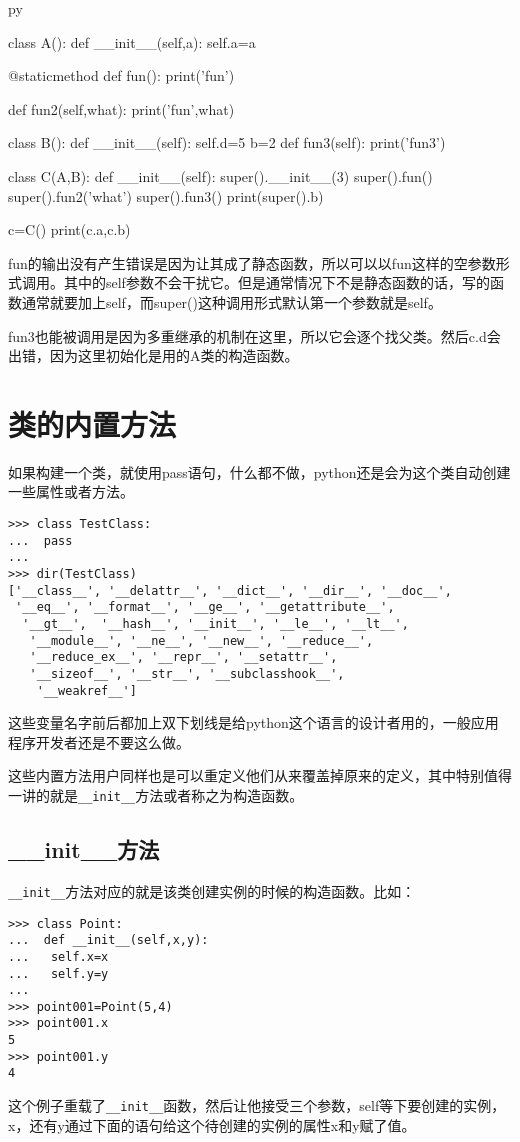 \documentclass[12pt,oneside]{book}
\begin{document}
\begin{common-format}
\begin{xverbatim}[129]{py}

class A():
    def __init__(self,a):
        self.a=a

    @staticmethod
    def fun():
        print('fun')

    def fun2(self,what):
        print('fun',what)

class B():
    def __init__(self):
        self.d=5
    b=2
    def fun3(self):
        print('fun3')

class C(A,B):
    def __init__(self):
        super().__init__(3)
        super().fun()
        super().fun2('what')
        super().fun3()
        print(super().b)

c=C()
print(c.a,c.b)
\end{xverbatim}
fun的输出没有产生错误是因为让其成了静态函数，所以可以以fun这样的空参数形式调用。其中的self参数不会干扰它。但是通常情况下不是静态函数的话，写的函数通常就要加上self，而super()这种调用形式默认第一个参数就是self。

fun3也能被调用是因为多重继承的机制在这里，所以它会逐个找父类。然后c.d会出错，因为这里初始化是用的A类的构造函数。


\section{类的内置方法}
如果构建一个类，就使用pass语句，什么都不做，python还是会为这个类自动创建一些属性或者方法。
\begin{Verbatim}
>>> class TestClass:
...  pass
... 
>>> dir(TestClass)
['__class__', '__delattr__', '__dict__', '__dir__', '__doc__',
 '__eq__', '__format__', '__ge__', '__getattribute__',
  '__gt__',  '__hash__', '__init__', '__le__', '__lt__',
   '__module__', '__ne__', '__new__', '__reduce__', 
   '__reduce_ex__', '__repr__', '__setattr__', 
   '__sizeof__', '__str__', '__subclasshook__',
    '__weakref__']
\end{Verbatim}

这些变量名字前后都加上双下划线是给python这个语言的设计者用的，一般应用程序开发者还是不要这么做。

这些内置方法用户同样也是可以重定义他们从来覆盖掉原来的定义，其中特别值得一讲的就是\verb+__init__+方法或者称之为构造函数。

\subsection{\_\_init\_\_{}方法}
\verb+__init__+方法对应的就是该类创建实例的时候的构造函数。比如：
\begin{Verbatim}
>>> class Point:
...  def __init__(self,x,y):
...   self.x=x
...   self.y=y
... 
>>> point001=Point(5,4)
>>> point001.x
5
>>> point001.y
4
\end{Verbatim}
这个例子重载了\verb+__init__+函数，然后让他接受三个参数，self等下要创建的实例，x，还有y通过下面的语句给这个待创建的实例的属性x和y赋了值。



\end{common-format}
\end{document}
